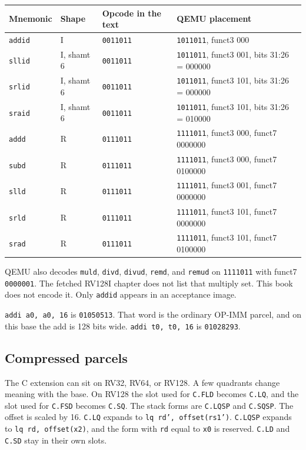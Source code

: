 \begin{center}
\begingroup
\scriptsize
\setlength{\tabcolsep}{3pt}
\begin{tabular}{@{}lllp{6.4cm}@{}}
\toprule
Mnemonic & Shape & Opcode in the text & QEMU placement \\
\midrule
\texttt{addid} & I & \texttt{0011011} & \texttt{1011011}, funct3 000 \\
\texttt{sllid} & I, shamt 6 & \texttt{0011011} & \texttt{1011011}, funct3 001, bits 31:26 = 000000 \\
\texttt{srlid} & I, shamt 6 & \texttt{0011011} & \texttt{1011011}, funct3 101, bits 31:26 = 000000 \\
\texttt{sraid} & I, shamt 6 & \texttt{0011011} & \texttt{1011011}, funct3 101, bits 31:26 = 010000 \\
\texttt{addd} & R & \texttt{0111011} & \texttt{1111011}, funct3 000, funct7 0000000 \\
\texttt{subd} & R & \texttt{0111011} & \texttt{1111011}, funct3 000, funct7 0100000 \\
\texttt{slld} & R & \texttt{0111011} & \texttt{1111011}, funct3 001, funct7 0000000 \\
\texttt{srld} & R & \texttt{0111011} & \texttt{1111011}, funct3 101, funct7 0000000 \\
\texttt{srad} & R & \texttt{0111011} & \texttt{1111011}, funct3 101, funct7 0100000 \\
\bottomrule
\end{tabular}
\endgroup
\end{center}

QEMU also decodes \texttt{muld}, \texttt{divd}, \texttt{divud}, \texttt{remd}, and \texttt{remud} on \texttt{1111011} with funct7 \texttt{0000001}. The fetched RV128I chapter does not list that multiply set. This book does not encode it. Only \texttt{addid} appears in an acceptance image.

\texttt{addi a0, a0, 16} is \texttt{01050513}. That word is the ordinary OP-IMM parcel, and on this base the add is 128 bits wide. \texttt{addi t0, t0, 16} is \texttt{01028293}.

\subsection{Compressed parcels}

The C extension can sit on RV32, RV64, or RV128. A few quadrants change meaning with the base. On RV128 the slot used for \texttt{C.FLD} becomes \texttt{C.LQ}, and the slot used for \texttt{C.FSD} becomes \texttt{C.SQ}. The stack forms are \texttt{C.LQSP} and \texttt{C.SQSP}. The offset is scaled by 16. \texttt{C.LQ} expands to \texttt{lq rd', offset(rs1')}. \texttt{C.LQSP} expands to \texttt{lq rd, offset(x2)}, and the form with \texttt{rd} equal to \texttt{x0} is reserved. \texttt{C.LD} and \texttt{C.SD} stay in their own slots.

